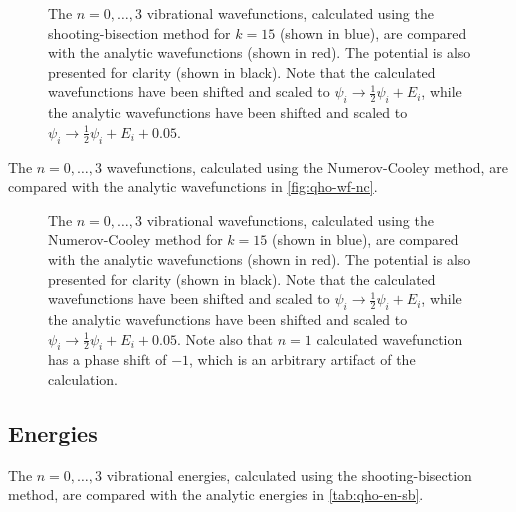 \documentclass{article}
\begin{document}
\begin{figure}[h]
  \begin{center}
    
  \end{center}
  \caption[S-B Wavefunctions]{
    The $n = 0, \dotsc, 3$ vibrational wavefunctions, calculated using the
    shooting-bisection method for $k = 15$ (shown in blue), are compared with
    the analytic wavefunctions (shown in red).
    The potential is also presented for clarity (shown in black).
    Note that the calculated wavefunctions have been shifted and scaled to
    $\psi_{i} \to \tfrac{1}{2}\psi_{i} + E_{i}$, while the analytic
    wavefunctions have been shifted and scaled to
    $\psi_{i} \to \tfrac{1}{2}\psi_{i} + E_{i} + 0.05$.
  }
  \label{fig:qho-wf-sb}
\end{figure}

The $n = 0, \dotsc, 3$ wavefunctions, calculated using the Numerov-Cooley
method, are compared with the analytic wavefunctions in \autoref{fig:qho-wf-nc}.

\begin{figure}[h]
  \begin{center}
    
  \end{center}
  \caption[N-C Wavefunctions]{
    The $n = 0, \dotsc, 3$ vibrational wavefunctions, calculated using the
    Numerov-Cooley method for $k = 15$ (shown in blue), are compared with the
    analytic wavefunctions (shown in red).
    The potential is also presented for clarity (shown in black).
    Note that the calculated wavefunctions have been shifted and scaled to
    $\psi_{i} \to \tfrac{1}{2}\psi_{i} + E_{i}$, while the analytic
    wavefunctions have been shifted and scaled to
    $\psi_{i} \to \tfrac{1}{2}\psi_{i} + E_{i} + 0.05$.
    Note also that $n = 1$ calculated wavefunction has a phase shift of $-1$,
    which is an arbitrary artifact of the calculation.
  }
  \label{fig:qho-wf-nc}
\end{figure}

\subsection*{Energies}
\label{sec:qho-energies}

The $n = 0, \dotsc, 3$ vibrational energies, calculated using the
shooting-bisection method, are compared with the analytic energies in
\autoref{tab:qho-en-sb}.
\end{document}
